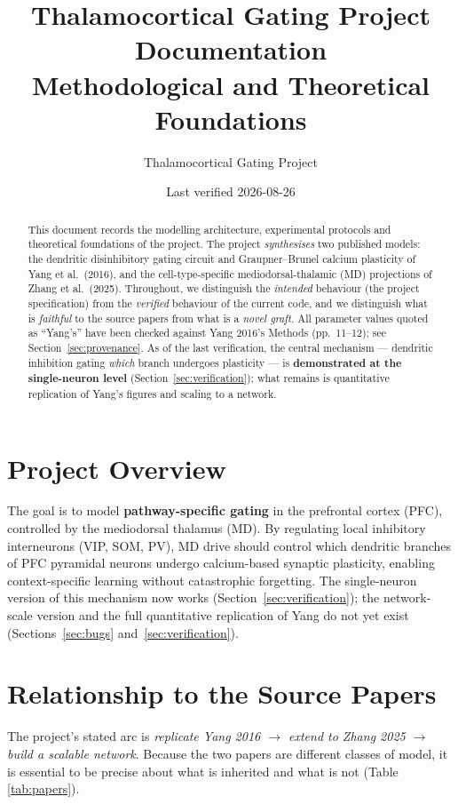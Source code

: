 \documentclass[11pt,a4paper]{article}
\title{Thalamocortical Gating Project Documentation \\
\large Methodological and Theoretical Foundations}
\author{Thalamocortical Gating Project}
\date{Last verified 2026-08-26}
\begin{document}
\maketitle

\begin{abstract}
This document records the modelling architecture, experimental protocols and theoretical
foundations of the project. The project \emph{synthesises} two published models: the
dendritic disinhibitory gating circuit and Graupner--Brunel calcium plasticity of
Yang et al.\ (2016), and the cell-type-specific mediodorsal-thalamic (MD) projections of
Zhang et al.\ (2025). Throughout, we distinguish the \emph{intended} behaviour (the
project specification) from the \emph{verified} behaviour of the current code, and we
distinguish what is \emph{faithful} to the source papers from what is a \emph{novel
graft}. All parameter values quoted as ``Yang's'' have been checked against Yang 2016's
Methods (pp.~11--12); see Section~\ref{sec:provenance}. As of the last verification, the
central mechanism --- dendritic inhibition gating \emph{which} branch undergoes plasticity
--- is \textbf{demonstrated at the single-neuron level} (Section~\ref{sec:verification});
what remains is quantitative replication of Yang's figures and scaling to a network.
\end{abstract}

\section{Project Overview}
The goal is to model \textbf{pathway-specific gating} in the prefrontal cortex (PFC),
controlled by the mediodorsal thalamus (MD). By regulating local inhibitory interneurons
(VIP, SOM, PV), MD drive should control which dendritic branches of PFC pyramidal neurons
undergo calcium-based synaptic plasticity, enabling context-specific learning without
catastrophic forgetting. The single-neuron version of this mechanism now works
(Section~\ref{sec:verification}); the network-scale version and the full quantitative
replication of Yang do not yet exist (Sections~\ref{sec:bugs} and~\ref{sec:verification}).

\section{Relationship to the Source Papers}
\label{sec:papers}
The project's stated arc is \emph{replicate Yang 2016 $\rightarrow$ extend to Zhang 2025
$\rightarrow$ build a scalable network}. Because the two papers are different classes of
model, it is essential to be precise about what is inherited and what is not
(Table \ref{tab:papers}).
\end{document}
